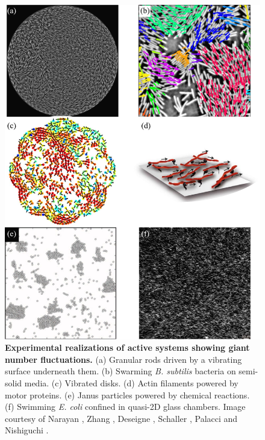 \begin{figure}[htbp]
 \begin{center}
 \includegraphics[width=5.5 in]{Figs/1-Intro/GNF/GNF-experiments.pdf}
 \end{center}
 \caption[Experimental realizations of active systems showing giant number fluctuations]
 {
 \textbf{Experimental realizations of active systems showing giant number fluctuations.}
 (a) Granular rods driven by a vibrating surface underneath them.
 (b) Swarming \textit{B. subtilis} bacteria on semi-solid media.
 (c) Vibrated disks.
 (d) Actin filaments powered by motor proteins.
 (e) Janus particles powered by chemical reactions.
 (f) Swimming \textit{E. coli} confined in quasi-2D glass chambers.
 Image courtesy of Narayan \cite{Narayan2007}, Zhang \cite{Zhang2010}, Deseigne \cite{Deseigne2010}, Schaller \cite{Schaller2013}, Palacci \cite{Palacci2013} and Nishiguchi \cite{Nishiguchi2017}.
 }
 \label{fig:GNF-experiments}
\end{figure}

